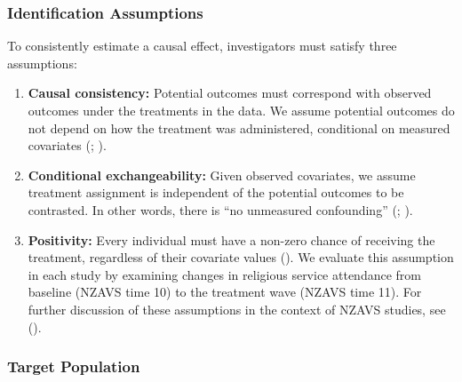 \documentclass[
  single column]{article}
\begin{document}
\subsubsection{Identification
Assumptions}\label{identification-assumptions}

To consistently estimate a causal effect, investigators must satisfy
three assumptions:

\begin{enumerate}
\def\labelenumi{\arabic{enumi}.}
\item
  \textbf{Causal consistency:} Potential outcomes must correspond with
  observed outcomes under the treatments in the data. We assume
  potential outcomes do not depend on how the treatment was
  administered, conditional on measured covariates
  (;
  ).
\item
  \textbf{Conditional exchangeability:} Given observed covariates, we
  assume treatment assignment is independent of the potential outcomes
  to be contrasted. In other words, there is ``no unmeasured
  confounding'' (;
  ).
\item
  \textbf{Positivity:} Every individual must have a non-zero chance of
  receiving the treatment, regardless of their covariate values
  (). We evaluate
  this assumption in each study by examining changes in religious
  service attendance from baseline (NZAVS time 10) to the treatment wave
  (NZAVS time 11). For further discussion of these assumptions in the
  context of NZAVS studies, see ().
\end{enumerate}

\subsubsection{Target Population}\label{target-population}
\end{document}
